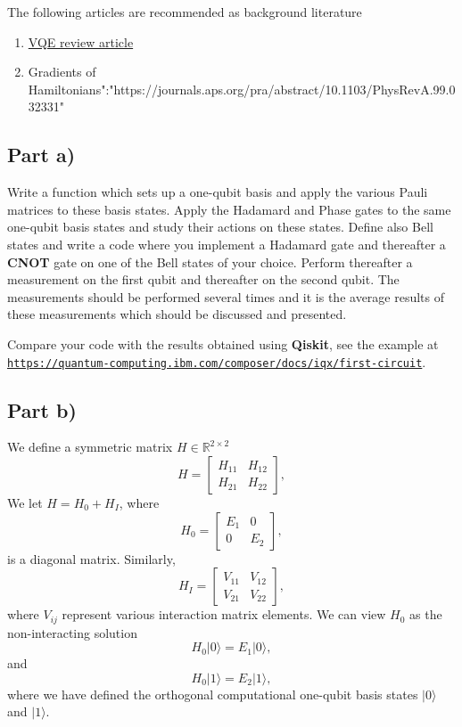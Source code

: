 \documentclass[%
oneside,                 %
final,                   %
10pt]{article}
\begin{document}
The following articles are recommended as background literature
\begin{enumerate}
\item \href{{https://www.sciencedirect.com/science/article/pii/S0370157322003118?via%

\item Gradients of Hamiltonians":"https://journals.aps.org/pra/abstract/10.1103/PhysRevA.99.032331"
\end{enumerate}

\noindent
\subsection*{Part a)}

Write a function which sets up a one-qubit basis and apply the various
Pauli matrices to these basis states.  Apply the Hadamard and Phase
gates to the same one-qubit basis states and study their actions on
these states. Define also Bell states and write a code where you
implement a Hadamard gate and thereafter a \textbf{CNOT} gate on one of the Bell
states of your choice. Perform thereafter a measurement on the first qubit and
thereafter on the second qubit. The measurements should be performed 
several times and it is the average results of these measurements
which should be discussed and presented.

Compare your code with the results obtained using \textbf{Qiskit}, see the
example at
\href{{https://quantum-computing.ibm.com/composer/docs/iqx/first-circuit}}{\nolinkurl{https://quantum-computing.ibm.com/composer/docs/iqx/first-circuit}}.

\subsection*{Part b)}

We define a  symmetric matrix  $H\in {\mathbb{R}}^{2\times 2}$
\[
H = \begin{bmatrix} H_{11} & H_{12} \\ H_{21} & H_{22}
\end{bmatrix},
\]
We  let $H = H_0 + H_I$, where
\[
H_0= \begin{bmatrix} E_1 & 0 \\ 0 & E_2\end{bmatrix},
\]
is a diagonal matrix. Similarly,
\[
H_I= \begin{bmatrix} V_{11} & V_{12} \\ V_{21} & V_{22}\end{bmatrix},
\]
where $V_{ij}$ represent various interaction matrix elements.
We can view $H_0$ as the non-interacting solution
\begin{equation}
       H_0\vert 0 \rangle =E_1\vert 0 \rangle,
\end{equation}
and
\begin{equation}
       H_0\vert 1\rangle =E_2\vert 1\rangle,
\end{equation}
where we have defined the orthogonal computational one-qubit basis states $\vert 0\rangle$ and $\vert 1\rangle$.
\end{document}
